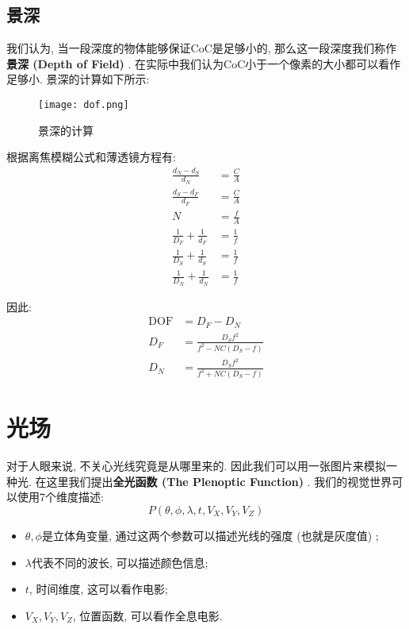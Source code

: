 \subsection{景深}

	我们认为, 当一段深度的物体能够保证CoC是足够小的, 那么这一段深度我们称作\textbf{景深 (Depth of Field) }. 在实际中我们认为CoC小于一个像素的大小都可以看作足够小. 景深的计算如下所示: 
	
		\begin{figure}[H]
		\centering
		\texttt{[image: dof.png]}
		\caption{景深的计算}
		\label{fig:dof}
	\end{figure}

根据离焦模糊公式和薄透镜方程有: 
\begin{equation}
	\begin{split}
		\frac{d_{N}-d_{S}}{d_{N}} &=\frac{C}{A} \\
		\frac{d_{S}-d_{F}}{d_{F}} &=\frac{C}{A} \\
		N &=\frac{f}{A} \\
		\frac{1}{D_{F}}+\frac{1}{d_{F}} &=\frac{1}{f} \\
		\frac{1}{D_{S}}+\frac{1}{d_{S}} &=\frac{1}{f} \\
		\frac{1}{D_{N}}+\frac{1}{d_{N}} &=\frac{1}{f}
	\end{split}
\end{equation}

因此: 
\begin{equation}
	\begin{split}
		\mathrm{DOF}&=D_{F}-D_{N} \\
		D_{F}&=\frac{D_{S} f^{2}}{f^{2}-N C\left(D_{S}-f\right)}\\
		D_{N}&=\frac{D_{S} f^{2}}{f^{2}+N C\left(D_{S}-f\right)}
	\end{split}
\end{equation}

\section{光场}

对于人眼来说, 不关心光线究竟是从哪里来的. 因此我们可以用一张图片来模拟一种光. 在这里我们提出\textbf{全光函数 (The Plenoptic Function) }. 我们的视觉世界可以使用7个维度描述: 
\begin{equation}
	P(\theta,\phi,\lambda,t,V_X,V_Y,V_Z)
\end{equation}

\begin{itemize}
	\item $\theta,\phi$是立体角变量, 通过这两个参数可以描述光线的强度 (也就是灰度值) ; 
	\item $\lambda$代表不同的波长, 可以描述颜色信息; 
	\item $t$, 时间维度, 这可以看作电影; 
	\item $V_X,V_Y,V_Z$, 位置函数, 可以看作全息电影. 
\end{itemize}


